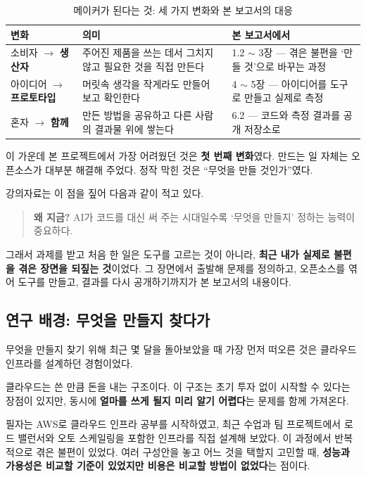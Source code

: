 \documentclass[10pt,a4paper]{article}
\begin{document}
\begin{table}[!h]
\centering
\caption{메이커가 된다는 것: 세 가지 변화와 본 보고서의 대응}
\label{tab:maker}
\footnotesize
\begin{tabularx}{\textwidth}{l Y Y}
\toprule
\textbf{변화} & \textbf{의미} & \textbf{본 보고서에서} \\
\midrule
소비자 $\rightarrow$ \textbf{생산자} & 주어진 제품을 쓰는 데서 그치지 않고 필요한 것을 직접 만든다 & 1.2 $\sim$ 3장 --- 겪은 불편을 `만들 것'으로 바꾸는 과정 \\
아이디어 $\rightarrow$ \textbf{프로토타입} & 머릿속 생각을 작게라도 만들어 보고 확인한다 & 4 $\sim$ 5장 --- 아이디어를 도구로 만들고 실제로 측정 \\
혼자 $\rightarrow$ \textbf{함께} & 만든 방법을 공유하고 다른 사람의 결과물 위에 쌓는다 & 6.2 --- 코드와 측정 결과를 공개 저장소로 \\
\bottomrule
\end{tabularx}
\end{table}

이 가운데 본 프로젝트에서 가장 어려웠던 것은 \textbf{첫 번째 변화}였다. 만드는 일 자체는 오픈소스가 대부분 해결해 주었다. 정작 막힌 것은 ``무엇을 만들 것인가''였다.

강의자료는 이 점을 짚어 다음과 같이 적고 있다.

\begin{quote}
\textbf{왜 지금?} AI가 코드를 대신 써 주는 시대일수록 `무엇을 만들지' 정하는 능력이 중요하다.
\end{quote}

그래서 과제를 받고 처음 한 일은 도구를 고르는 것이 아니라, \textbf{최근 내가 실제로 불편을 겪은 장면을 되짚는 것}이었다. 그 장면에서 출발해 문제를 정의하고, 오픈소스를 엮어 도구를 만들고, 결과를 다시 공개하기까지가 본 보고서의 내용이다.

\subsection{연구 배경: 무엇을 만들지 찾다가}

무엇을 만들지 찾기 위해 최근 몇 달을 돌아보았을 때 가장 먼저 떠오른 것은 클라우드 인프라를 설계하던 경험이었다.

클라우드는 쓴 만큼 돈을 내는 구조이다. 이 구조는 초기 투자 없이 시작할 수 있다는 장점이 있지만, 동시에 \textbf{얼마를 쓰게 될지 미리 알기 어렵다}는 문제를 함께 가져온다.

필자는 AWS로 클라우드 인프라 공부를 시작하였고, 최근 수업과 팀 프로젝트에서 로드 밸런서와 오토 스케일링을 포함한 인프라를 직접 설계해 보았다. 이 과정에서 반복적으로 겪은 불편이 있었다. 여러 구성안을 놓고 어느 것을 택할지 고민할 때, \textbf{성능과 가용성은 비교할 기준이 있었지만 비용은 비교할 방법이 없었다}는 점이다.
\end{document}
